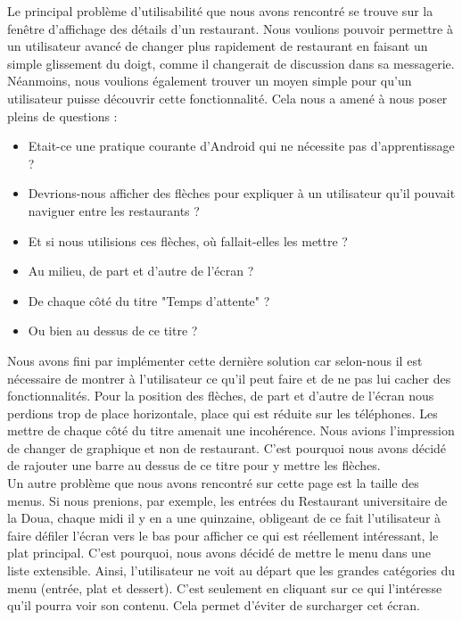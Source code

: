 Le principal problème d'utilisabilité que nous avons rencontré se trouve sur 
la fenêtre d'affichage des détails d'un restaurant. Nous voulions pouvoir 
permettre à un utilisateur avancé de changer plus rapidement de restaurant
en faisant un simple glissement du doigt, comme il changerait de discussion dans sa
messagerie. Néanmoins, nous voulions également trouver un moyen simple pour
qu'un utilisateur puisse découvrir cette fonctionnalité. Cela nous a amené 
à nous poser pleins de questions :  

\begin{itemize}
\item Etait-ce une pratique courante d'Android qui ne nécessite pas d'apprentissage ?
\item Devrions-nous afficher des flèches pour expliquer à un utilisateur qu'il pouvait
naviguer entre les restaurants ? 
\item Et si nous utilisions ces flèches, où fallait-elles les mettre ?
\item Au milieu, de part et d'autre de l'écran ?
\item De chaque côté du titre "Temps d'attente" ?
\item Ou bien au dessus de ce titre ? 
\end{itemize}

Nous avons fini par implémenter cette dernière solution car selon-nous il est nécessaire
de montrer à l'utilisateur ce qu'il peut faire et de ne pas lui cacher des fonctionnalités.
Pour la position des flèches, de part et d'autre de l'écran nous perdions trop de place horizontale, 
place qui est réduite sur les téléphones. Les mettre de chaque côté du titre amenait une
incohérence. Nous avions l'impression de changer de graphique et non de restaurant. C'est
pourquoi nous avons décidé de rajouter une barre au dessus de ce titre pour y mettre les
flèches. 
\\
 
Un autre problème que nous avons rencontré sur cette page est la taille des menus. Si 
nous prenions, par exemple, les entrées du Restaurant universitaire de la Doua, chaque midi
il y en a une quinzaine, obligeant de ce fait l'utilisateur
à faire défiler l'écran vers le bas pour afficher ce qui est réellement intéressant, le 
plat principal. C'est pourquoi, nous avons décidé de mettre le menu dans une liste extensible.
Ainsi, l'utilisateur ne voit au départ que les grandes catégories du menu (entrée, plat et
dessert). C'est seulement en cliquant sur ce qui l'intéresse qu'il pourra voir son contenu.
Cela permet d'éviter de surcharger cet écran. 

